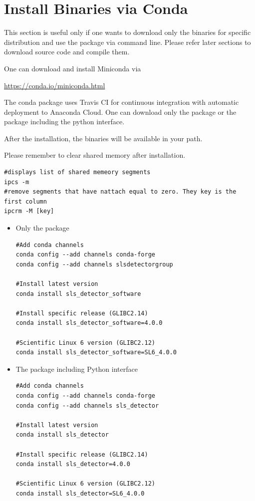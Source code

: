 \documentclass{article}
\begin{document}
\section{Install Binaries via Conda}
This section is useful only if one wants to download only the binaries for
specific distribution and use the package via command line. Please refer later
sections to download source code and compile them.


One can download and install Miniconda via 

\url{https://conda.io/miniconda.html}


The conda package uses Travis CI for continuous integration with
automatic deployment to Anaconda Cloud. One can download only the package or the
package including the python interface.


After the installation, the binaries will be available in your path.

Please remember to clear shared memory after installation.
\begin{verbatim}
#displays list of shared memeory segments 
ipcs -m
#remove segments that have nattach equal to zero. They key is the first column
ipcrm -M [key]
\end{verbatim}

\begin{itemize}
 \item Only the package
\begin{verbatim}
#Add conda channels
conda config --add channels conda-forge
conda config --add channels slsdetectorgroup

#Install latest version
conda install sls_detector_software

#Install specific release (GLIBC2.14)
conda install sls_detector_software=4.0.0

#Scientific Linux 6 version (GLIBC2.12)
conda install sls_detector_software=SL6_4.0.0
\end{verbatim}
 \item The package including Python interface
\begin{verbatim}
#Add conda channels
conda config --add channels conda-forge
conda config --add channels sls_detector

#Install latest version
conda install sls_detector

#Install specific release (GLIBC2.14)
conda install sls_detector=4.0.0

#Scientific Linux 6 version (GLIBC2.12)
conda install sls_detector=SL6_4.0.0
\end{verbatim}
\end{itemize}
\end{document}
